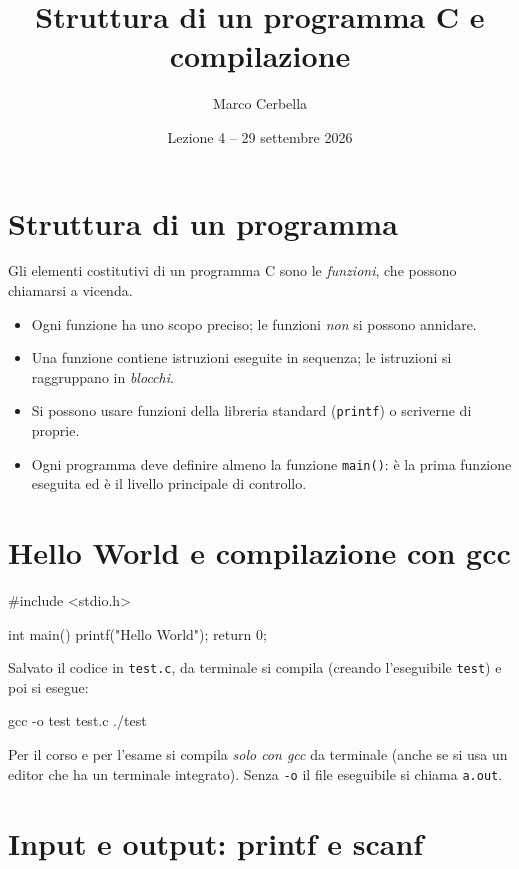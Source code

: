 \documentclass[11pt,a4paper]{article}
\title{Struttura di un programma C e compilazione}
\author{Marco Cerbella}
\date{Lezione 4 -- 29 settembre 2026}
\begin{document}
\maketitle

\section{Struttura di un programma}

Gli elementi costitutivi di un programma C sono le \emph{funzioni}, che possono
chiamarsi a vicenda.
\begin{itemize}
    \item Ogni funzione ha uno scopo preciso; le funzioni \emph{non} si possono
          annidare.
    \item Una funzione contiene istruzioni eseguite in sequenza; le istruzioni
          si raggruppano in \emph{blocchi}.
    \item Si possono usare funzioni della libreria standard (\lstinline|printf|)
          o scriverne di proprie.
    \item Ogni programma deve definire almeno la funzione \lstinline|main()|:
          è la prima funzione eseguita ed è il livello principale di controllo.
\end{itemize}

\section{Hello World e compilazione con gcc}

\begin{codice}
#include <stdio.h>

int main() {
    printf("Hello World\n");
    return 0;
}
\end{codice}

Salvato il codice in \texttt{test.c}, da terminale si compila (creando l'eseguibile \texttt{test}) e poi si esegue:
\begin{comando}
gcc -o test test.c
./test
\end{comando}

\begin{osservazione}
Per il corso e per l'esame si compila \emph{solo con gcc} da terminale (anche
se si usa un editor che ha un terminale integrato). Senza \lstinline|-o| il
file eseguibile si chiama \texttt{a.out}.
\end{osservazione}

\section{Input e output: printf e scanf}
\end{document}
